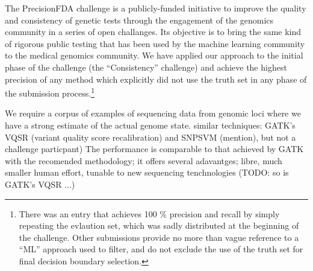 \documentclass{article}
\begin{document}
The PrecisionFDA challenge is a publicly-funded initiative to improve the quality and consistency of genetic tests through the engagement of the genomics community in a series of open challanges.
Its objective is to bring the same kind of rigorous public testing that has been used by the machine learning community to the medical genomics community.
We have applied our approach to the initial phase of the challenge (the ``Consistency'' challenge) and achieve the highest precision of any method which explicitly did not use the truth set in any phase of the submission process.\footnote{There was an entry that achieves 100 \% precision and recall by simply repeating the evlaution set, which was sadly distributed at the beginning of the challenge. Other submissions provide no more than vague reference to a ``ML'' approach used to filter, and do not exclude the use of the truth set for final decision boundary selection.}




We require a corpus of examples of sequencing data from genomic loci where we have a strong estimate of the actual genome state. %
 similar techniques: GATK's VQSR (variant quality score recalibration) and SNPSVM (mention), but not a challenge particpant)
The performance is comparable to that achieved by GATK with the recomended methodology; it offers several adavantges; libre, much smaller human effort, tunable to new sequencing tenchnologies (TODO: so is GATK's VQSR ...) 
\end{document}
